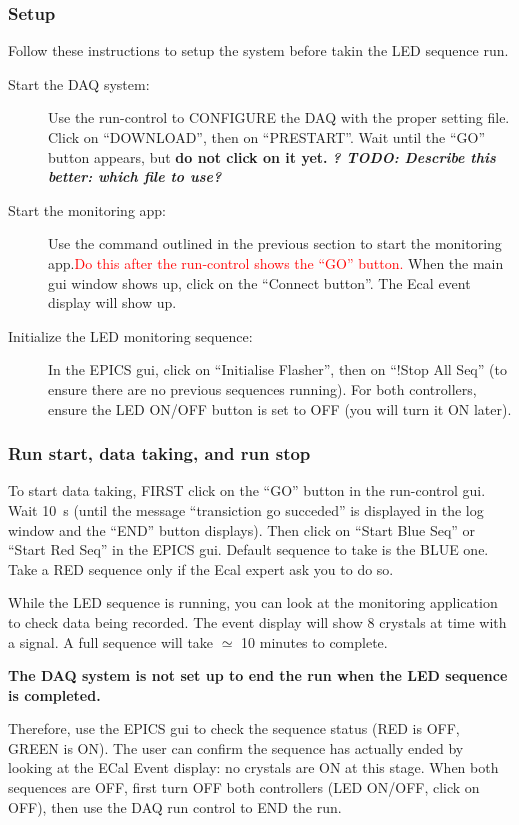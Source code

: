 \documentclass[12pt]{article}
\begin{document}
\subsubsection{Setup}
Follow these instructions to setup the system before takin the LED sequence run.

\begin{description}
\item[Start the DAQ system: ]{Use the run-control to CONFIGURE the DAQ with the proper setting file. Click on ``DOWNLOAD'', then on ``PRESTART''. Wait until the ``GO'' button appears, but {\bf do not click on it yet.}
\bf\it ? TODO: Describe this better: which file to use?
 }
\item[Start the monitoring app: ]{Use the command outlined in the previous section to start the monitoring app.\textcolor{red}{Do this after the run-control shows the ``GO'' button.} When the main gui window shows up, click on the ``Connect button''. The Ecal event display will show up.}
\item[Initialize the LED monitoring sequence:]{In the EPICS gui, click on ``Initialise Flasher'', then on ``!Stop All Seq'' (to ensure there are no previous sequences running). For both controllers, ensure the LED ON/OFF button is set to OFF (you will turn it ON later).} 
\end{description}
      
\subsubsection{Run start, data taking, and run stop}
To start data taking, FIRST click on the ``GO'' button in the run-control gui. Wait 10~s (until the message ``transiction go succeded'' is displayed in the log window and the ``END'' button displays). Then click on ``Start Blue Seq'' or ``Start Red Seq'' in the EPICS gui. Default sequence to take is the BLUE one. Take a RED sequence only if the Ecal expert ask you to do so.

While the LED sequence is running, you can look at the monitoring application to check data being recorded. The event display will show 8 crystals at time with a signal. A full sequence will take $\simeq$ 10 minutes to complete.

{\bf  The DAQ system is not set up to end the run when the LED sequence is completed.} 

Therefore, use the EPICS gui to check the sequence status (RED is OFF, GREEN is ON). The user can confirm the sequence has actually ended by looking at the ECal Event display: no crystals are ON at this stage.
When both sequences are OFF, first turn OFF both controllers (LED ON/OFF, click on OFF), then use the DAQ run control to END the run.
\end{document}
